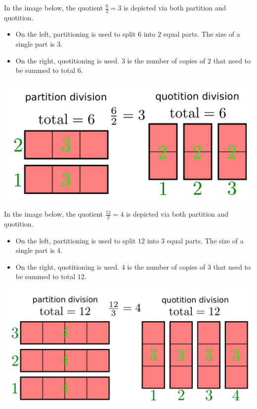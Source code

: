 \documentclass{article}
\begin{document}
\vspace{5mm}


In the image below, the quotient \(\frac{6}{2} = 3\) is depicted via both partition and quotition. 
\begin{itemize}
\item On the left, partitioning is used to split \(6\) into \(2\) equal parts. The size of a single part is \(3\). 
\item On the right, quotitioning is used. \(3\) is the number of copies of \(2\) that need to be summed to total \(6\). 
\end{itemize}
\includegraphics[width = \textwidth]{6_div_2}

\vspace{5mm}


In the image below, the quotient \(\frac{12}{3} = 4\) is depicted via both partition and quotition. 
\begin{itemize}
\item On the left, partitioning is used to split \(12\) into \(3\) equal parts. The size of a single part is \(4\). 
\item On the right, quotitioning is used. \(4\) is the number of copies of \(3\) that need to be summed to total \(12\). 
\end{itemize}
\includegraphics[width = \textwidth]{12_div_3}
\end{document}
